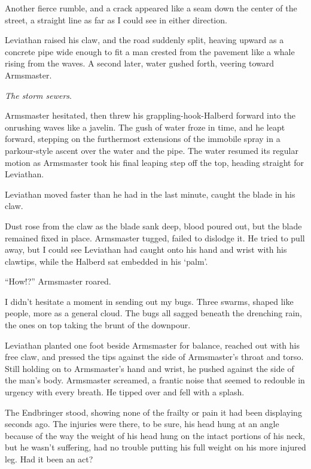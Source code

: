 Another fierce rumble, and a crack appeared like a seam down the center of the street, a straight line as far as I could see in either direction.



Leviathan raised his claw, and the road suddenly split, heaving upward as a concrete pipe wide enough to fit a man crested from the pavement like a whale rising from the waves.  A second later, water gushed forth, veering toward Armsmaster.



\emph{The storm sewers}.



Armsmaster hesitated, then threw his grappling-hook-Halberd forward into the onrushing waves like a javelin.  The gush of water froze in time, and he leapt forward, stepping on the furthermost extensions of the immobile spray in a parkour-style ascent over the water and the pipe.  The water resumed its regular motion as Armsmaster took his final leaping step off the top, heading straight for Leviathan.



Leviathan moved faster than he had in the last minute, caught the blade in his claw.



Dust rose from the claw as the blade sank deep, blood poured out, but the blade remained fixed in place.  Armsmaster tugged, failed to dislodge it.  He tried to pull away, but I could see Leviathan had caught onto his hand and wrist with his clawtips, while the Halberd sat embedded in his `palm'.



``How!?'' Armsmaster roared.



I didn't hesitate a moment in sending out my bugs.  Three swarms, shaped like people, more as a general cloud.  The bugs all sagged beneath the drenching rain, the ones on top taking the brunt of the downpour.



Leviathan planted one foot beside Armsmaster for balance, reached out with his free claw, and pressed the tips against the side of Armsmaster's throat and torso.  Still holding on to Armsmaster's hand and wrist, he pushed against the side of the man's body.  Armsmaster screamed, a frantic noise that seemed to redouble in urgency with every breath.  He tipped over and fell with a splash.



The Endbringer stood, showing none of the frailty or pain it had been displaying seconds ago.  The injuries were there, to be sure, his head hung at an angle because of the way the weight of his head hung on the intact portions of his neck, but he wasn't suffering, had no trouble putting his full weight on his more injured leg.  Had it been an act?



